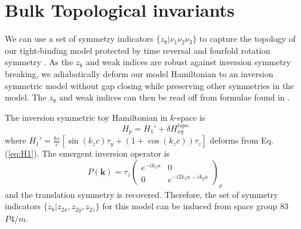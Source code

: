 





\section{Bulk Topological invariants} 

We can use a set of symmetry indicators $\{z_8| \nu_1 \nu_2 \nu_3\}$ to capture the topology of our tight-binding model protected by time reversal and fourfold rotation symmetry \cite{MappingSymmetryTopology}. As the $z_8$ and weak indices are robust against inversion symmetry breaking, we adiabatically deform our model Hamiltonian to an inversion symmetric model without gap closing while preserving other symmetries in the model. The $z_8$ and weak indices can then be read off from formulae found in \cite{MappingSymmetryTopology, Fu_Kane_07}. 

The inversion symmetric toy Hamiltonian in $k$-space is
\begin{equation}\label{eq:inversionXY}
    H_p = H_1' + \delta H_{xy}^{topo}
\end{equation} 
where $H_1'=\frac{\hbar v}{c}\left[\sin{(k_zc)}\tau_y +(1+\cos{(k_zc)})\tau_z\right]$ deforms from Eq.(\ref{eq:H1}). The emergent inversion operator is 
\begin{equation*}
P(\mathbf{k})=\tau_z\begin{pmatrix}
e^{-ik_xa} & 0\\
0 & e^{-i2k_xa-ik_ya}
\end{pmatrix}_{\mu}
\end{equation*}
and the translation symmetry is recovered. Therefore, the set of symmetry indicators $\{z_8|z_{2x},z_{2y},z_{2z}\}$ for this model can be induced from space group 83 $P4/m$\cite{MappingSymmetryTopology}. 

